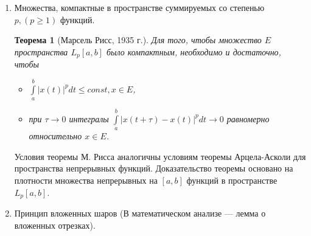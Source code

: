 \documentclass[12pt,a4paper,titlepage,oneside]{book}
\newcommand{\overbar}[1]{\mkern 1.5mu\overline{\mkern-1.5mu#1\mkern-1.5mu}\mkern 1.5mu}
\theoremstyle{definition}
\theoremstyle{plain}
\newtheorem*{theorem}{Теорема}
\theoremstyle{break}
\theoremstyle{remark}
\theoremstyle{remark}
\theoremstyle{remark}
\theoremstyle{remark}
\theoremstyle{plain}
\theoremstyle{plain}
\begin{document}
\begin{enumerate}
\begin{proof}
	Покажем, что компактное множество $H_{\varepsilon}$ образует в $E$ $\varepsilon$-сеть. Для любой функции $x\in E$ построим ломаную $\overbar{x}(t)$, $\overbar{x} \in H_{\varepsilon}$. Так как $x(t)$ непрерывна, то на отрезке $[t_k, t_{k+1}]$ она достигает своего максимального значения $M_k$ и своего минимального значения $m_k$: $m_k \leqslant x(t) \leqslant M_k, t \in [t_k, t_{k+1}]$. В этих же пределах лежат и значения линейной функции $\overbar{x}(t)$. Ясно, что $|x(t)-\overbar{x}(t)|\leqslant M_k-m_k, t \in [t_k, t_{k+1}]$.
	
	В силу выбора значения $\delta$ величины $M_k-m_k < \varepsilon$. Тогда и $\rho(x, \overbar{x}) < \varepsilon$. Согласно следствию теоремы Хаусдорфа, множество $E$ компактно в $C[a, b]$.
	
	$\underbar {Необходимость}$ Свойства функций из компактного множества $E$, указанные в теореме, сразу следуют из существования в $E$ $\underbar {конечной}$ $\varepsilon$-сети непрерывных на $[a, b]$ функций $x_1(t), x_2(t),\ldots,x_N(t)$.
\end{proof}

	\item Множества, компактные в пространстве суммируемых со степенью $p, (p \geqslant 1)$ функций.

\begin{theorem} [Марсель Рисс, 1935 г.]
Для того, чтобы множество $E$  пространства $L_p[a, b]$ было компактным, необходимо и достаточно, чтобы

\begin{itemize}

	\item $\int\limits_a^b |x(t)|^p dt \leqslant const, x \in E$,

	\item при $\tau \to 0$ интегралы $\int\limits_a^b |x(t+\tau)-x(t)|^p dt \to 0$ равномерно относительно $x \in E$.

\end{itemize}

\end{theorem}

Условия теоремы М. Рисса аналогичны условиям теоремы Арцела-Асколи для пространства непрерывных функций. Доказательство теоремы основано на плотности множества непрерывных на $[a, b]$ функций в пространстве $L_p [a, b]$.

	\item Принцип вложенных шаров (В математическом анализе --- лемма о вложенных отрезках).


\end{enumerate}
\end{document}

